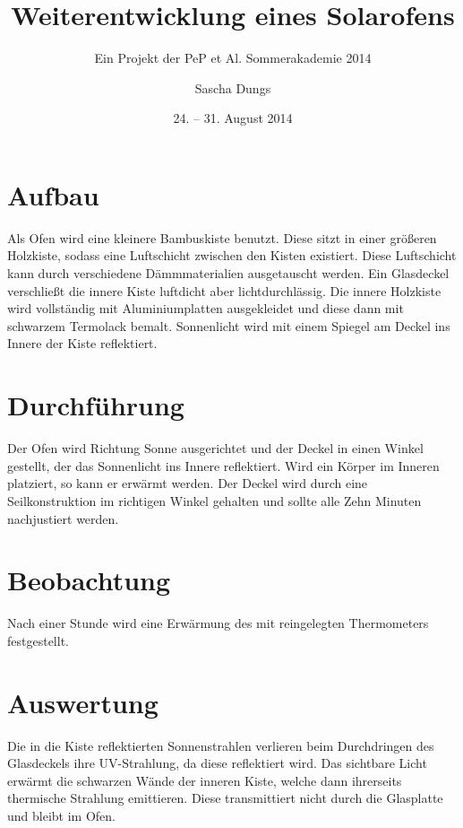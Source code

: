 

\title{Weiterentwicklung eines Solarofens}
\subtitle{Ein Projekt der PeP et Al. Sommerakademie 2014}
\date{24. -- 31. August 2014}

\author{Sascha Dungs}



\maketitle
\tableofcontents

\section{Aufbau}

Als Ofen wird eine kleinere Bambuskiste benutzt. Diese sitzt in einer größeren Holzkiste, sodass eine Luftschicht zwischen den Kisten existiert. Diese Luftschicht kann durch verschiedene Dämmmaterialien ausgetauscht werden. Ein Glasdeckel verschließt die innere Kiste luftdicht aber lichtdurchlässig. Die innere Holzkiste wird vollständig mit Aluminiumplatten ausgekleidet und diese dann mit schwarzem Termolack bemalt. Sonnenlicht wird mit einem Spiegel am Deckel ins Innere der Kiste reflektiert. 

\section{Durchführung}

Der Ofen wird Richtung Sonne ausgerichtet und der Deckel in einen Winkel gestellt, der das Sonnenlicht ins Innere reflektiert. Wird ein Körper im Inneren platziert, so kann er erwärmt werden. 
Der Deckel wird durch eine Seilkonstruktion im richtigen Winkel gehalten und sollte alle Zehn Minuten nachjustiert werden.

\section{Beobachtung}

Nach einer Stunde wird eine Erwärmung des mit reingelegten Thermometers festgestellt. 

\section{Auswertung}

Die in die Kiste reflektierten Sonnenstrahlen verlieren beim Durchdringen des Glasdeckels ihre UV-Strahlung, da diese reflektiert wird. Das sichtbare Licht erwärmt die schwarzen Wände der inneren Kiste, welche dann ihrerseits thermische Strahlung emittieren. Diese transmittiert nicht durch die Glasplatte und bleibt im Ofen.


